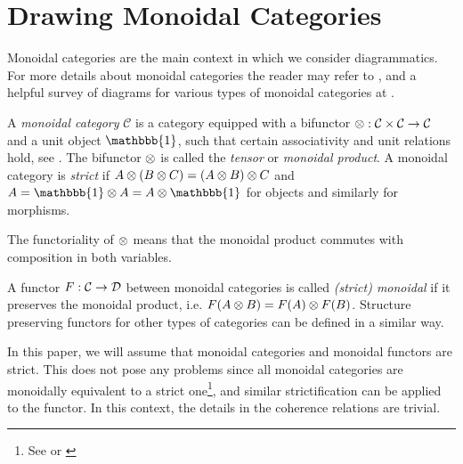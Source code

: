 \section{Drawing Monoidal Categories}
\label{sec:monoidal-cat}

Monoidal categories are the main context in which we consider diagrammatics. For more details about monoidal categories the reader may refer to \cite{tensor-categories}, and a helpful survey of diagrams for various types of monoidal categories at \cite{selinger-survey-of-graphical-monoidal-categories}.

\begin{definition}
    A \textit{monoidal category} $\mathcal{C}$ is a category equipped with a bifunctor $\otimes: \mathcal{C} \times \mathcal{C} \to \mathcal{C}$ and a unit object $\mathbbb{1}$, such that certain associativity and unit relations hold, see \cite[Definition 2.1.1, 2.2.8]{tensor-categories}. The bifunctor $\otimes$ is called the \textit{tensor} or \textit{monoidal product}. A monoidal category is \textit{strict} if $A \otimes (B \otimes C) = (A \otimes B) \otimes C$ and $A = \mathbbb{1} \tensor A = A \tensor \mathbbb{1}$ for objects and similarly for morphisms.
\end{definition}

The functoriality of $\otimes$ means that the monoidal product commutes with composition in both variables.

\begin{definition}
    A functor $F: \mathcal{C} \to \mathcal{D}$ between monoidal categories is called \textit{(strict) monoidal} if it preserves the monoidal product, i.e. $F(A \otimes B) = F(A) \otimes F(B)$. Structure preserving functors for other types of categories can be defined in a similar way.
\end{definition}

In this paper, we will assume that monoidal categories and monoidal functors are strict. This does not pose any problems since all monoidal categories are monoidally equivalent to a strict one\footnote{See \cite[\nopp VII.2]{maclane-category-theory} or \cite[Thm 2.8.5]{tensor-categories}}, and similar strictification can be applied to the functor. In this context, the details in the coherence relations are trivial.

